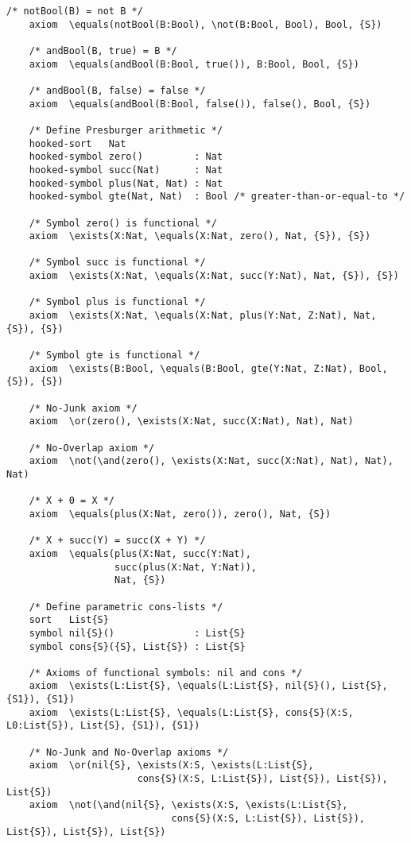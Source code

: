 \documentclass[UTF8,11pt]{article}
\theoremstyle{plain}
\theoremstyle{definition}
\theoremstyle{remark}
\begin{document}
\begin{Verbatim}[fontsize=\small]
    /* notBool(B) = not B */
    axiom  \equals(notBool(B:Bool), \not(B:Bool, Bool), Bool, {S})
    
    /* andBool(B, true) = B */
    axiom  \equals(andBool(B:Bool, true()), B:Bool, Bool, {S})
    
    /* andBool(B, false) = false */
    axiom  \equals(andBool(B:Bool, false()), false(), Bool, {S})
    
    /* Define Presburger arithmetic */
    hooked-sort   Nat
    hooked-symbol zero()         : Nat
    hooked-symbol succ(Nat)      : Nat
    hooked-symbol plus(Nat, Nat) : Nat
    hooked-symbol gte(Nat, Nat)  : Bool /* greater-than-or-equal-to */
    
    /* Symbol zero() is functional */
    axiom  \exists(X:Nat, \equals(X:Nat, zero(), Nat, {S}), {S})
    
    /* Symbol succ is functional */
    axiom  \exists(X:Nat, \equals(X:Nat, succ(Y:Nat), Nat, {S}), {S})
    
    /* Symbol plus is functional */
    axiom  \exists(X:Nat, \equals(X:Nat, plus(Y:Nat, Z:Nat), Nat, {S}), {S})
    
    /* Symbol gte is functional */
    axiom  \exists(B:Bool, \equals(B:Bool, gte(Y:Nat, Z:Nat), Bool, {S}), {S})
    
    /* No-Junk axiom */
    axiom  \or(zero(), \exists(X:Nat, succ(X:Nat), Nat), Nat)
    
    /* No-Overlap axiom */
    axiom  \not(\and(zero(), \exists(X:Nat, succ(X:Nat), Nat), Nat), Nat)
    
    /* X + 0 = X */
    axiom  \equals(plus(X:Nat, zero()), zero(), Nat, {S})
    
    /* X + succ(Y) = succ(X + Y) */
    axiom  \equals(plus(X:Nat, succ(Y:Nat),
                   succ(plus(X:Nat, Y:Nat)),
                   Nat, {S})
                   
    /* Define parametric cons-lists */
    sort   List{S}
    symbol nil{S}()              : List{S}
    symbol cons{S}({S}, List{S}) : List{S}
    
    /* Axioms of functional symbols: nil and cons */
    axiom  \exists(L:List{S}, \equals(L:List{S}, nil{S}(), List{S}, {S1}), {S1})
    axiom  \exists(L:List{S}, \equals(L:List{S}, cons{S}(X:S, L0:List{S}), List{S}, {S1}), {S1})
    
    /* No-Junk and No-Overlap axioms */
    axiom  \or(nil{S}, \exists(X:S, \exists(L:List{S}, 
                       cons{S}(X:S, L:List{S}), List{S}), List{S}), List{S})
    axiom  \not(\and(nil{S}, \exists(X:S, \exists(L:List{S}, 
                             cons{S}(X:S, L:List{S}), List{S}), List{S}), List{S}), List{S})
    

\end{Verbatim}
\end{document}
